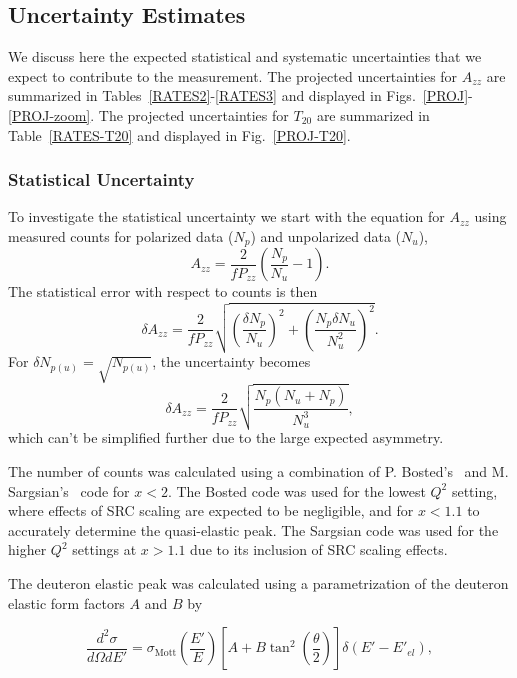 \subsection{Uncertainty Estimates}
\label{uncertainties}
We discuss here the expected statistical and systematic uncertainties that we expect to contribute to the measurement. The projected uncertainties for $A_{zz}$ are summarized in Tables~\ref{RATES2}-\ref{RATES3} and displayed in Figs.~\ref{PROJ}-\ref{PROJ-zoom}. The projected uncertainties for $T_{20}$ are summarized in Table~\ref{RATES-T20} and displayed in Fig.~\ref{PROJ-T20}.  

\subsubsection{Statistical Uncertainty}
\label{stat}
To investigate the statistical uncertainty we start with the equation for $A_{zz}$ using
measured counts for polarized data ($N_p$) and unpolarized data ($N_u$), 
\begin{equation}
A_{zz}=\frac{2}{fP_{zz}}\left(\frac{N_p}{N_u}-1\right).
\end{equation}
The statistical error with respect to counts is then
\begin{equation}
\delta A_{zz}=\frac{2}{fP_{zz}}\sqrt{\left(\frac{\delta N_p}{N_u}\right)^2+\left(\frac{N_p\delta N_u}{N_u^2}\right)^2}.
\end{equation}
For $\delta N_{p(u)}=\sqrt{N_{p(u)}}$, the uncertainty becomes
\begin{equation}
\label{dAzz}
\delta A_{zz}=\frac{2}{fP_{zz}}\sqrt{\frac{N_p(N_u + N_p)}{N_u^3}},
\end{equation}
which can't be simplified further due to the large expected asymmetry.

The number of counts was calculated using a combination of P. Bosted's~\cite{Bosted:2012qc} and M. Sargsian's~\cite{misak-convo} code for $x<2$. The Bosted code was used for the lowest $Q^2$ setting, where effects of SRC scaling are expected to be negligible, and for $x<1.1$ to accurately determine the quasi-elastic peak. The Sargsian code was used for the higher $Q^2$ settings at $x>1.1$ due to its inclusion of SRC scaling effects.

The deuteron elastic peak was calculated using a parametrization of the deuteron elastic form factors $A$ and $B$ by

\begin{equation}
\frac{d^2 \sigma}{d\Omega dE'} = \sigma_{\mathrm{Mott}}\left(\frac{E'}{E}\right)\left[ A + B \tan ^2 \left( \frac{\theta}{2} \right) \right] \delta (E'-E'_{el}),
\end{equation}

